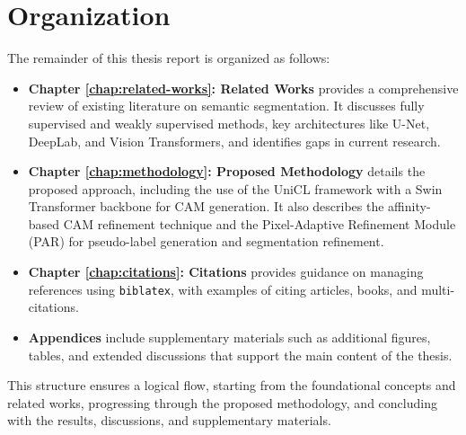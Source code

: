 

\section{Organization}
\label{sec:organization}

The remainder of this thesis report is organized as follows:

\begin{itemize}
    \item \textbf{Chapter \ref{chap:related-works}: Related Works} provides a comprehensive review of existing literature on semantic segmentation. It discusses fully supervised and weakly supervised methods, key architectures like U-Net, DeepLab, and Vision Transformers, and identifies gaps in current research.

    \item \textbf{Chapter \ref{chap:methodology}: Proposed Methodology} details the proposed approach, including the use of the UniCL framework with a Swin Transformer backbone for CAM generation. It also describes the affinity-based CAM refinement technique and the Pixel-Adaptive Refinement Module (PAR) for pseudo-label generation and segmentation refinement.

    \item \textbf{Chapter \ref{chap:citations}: Citations} provides guidance on managing references using \texttt{biblatex}, with examples of citing articles, books, and multi-citations.

    \item \textbf{Appendices} include supplementary materials such as additional figures, tables, and extended discussions that support the main content of the thesis.
\end{itemize}

This structure ensures a logical flow, starting from the foundational concepts and related works, progressing through the proposed methodology, and concluding with the results, discussions, and supplementary materials.

